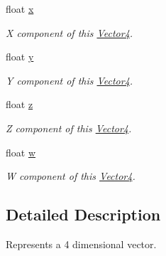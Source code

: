 \begin{DoxyCompactItemize}
\item 
\hypertarget{classchaos_1_1gfx_1_1_vector4_a74f8e26ec8f6c55a11ed5a423fb0eec4}{float \hyperlink{classchaos_1_1gfx_1_1_vector4_a74f8e26ec8f6c55a11ed5a423fb0eec4}{x}}\label{classchaos_1_1gfx_1_1_vector4_a74f8e26ec8f6c55a11ed5a423fb0eec4}

\begin{DoxyCompactList}\small\item\em X component of this \hyperlink{classchaos_1_1gfx_1_1_vector4}{Vector4}. \end{DoxyCompactList}\item 
\hypertarget{classchaos_1_1gfx_1_1_vector4_aa823679c8ce9d8b882f7e05f5670ee74}{float \hyperlink{classchaos_1_1gfx_1_1_vector4_aa823679c8ce9d8b882f7e05f5670ee74}{y}}\label{classchaos_1_1gfx_1_1_vector4_aa823679c8ce9d8b882f7e05f5670ee74}

\begin{DoxyCompactList}\small\item\em Y component of this \hyperlink{classchaos_1_1gfx_1_1_vector4}{Vector4}. \end{DoxyCompactList}\item 
\hypertarget{classchaos_1_1gfx_1_1_vector4_ae1e282cb0c262db6c20f29c34d727938}{float \hyperlink{classchaos_1_1gfx_1_1_vector4_ae1e282cb0c262db6c20f29c34d727938}{z}}\label{classchaos_1_1gfx_1_1_vector4_ae1e282cb0c262db6c20f29c34d727938}

\begin{DoxyCompactList}\small\item\em Z component of this \hyperlink{classchaos_1_1gfx_1_1_vector4}{Vector4}. \end{DoxyCompactList}\item 
\hypertarget{classchaos_1_1gfx_1_1_vector4_a3cd40a2e6ce1fd10a0d2c8136965e9dd}{float \hyperlink{classchaos_1_1gfx_1_1_vector4_a3cd40a2e6ce1fd10a0d2c8136965e9dd}{w}}\label{classchaos_1_1gfx_1_1_vector4_a3cd40a2e6ce1fd10a0d2c8136965e9dd}

\begin{DoxyCompactList}\small\item\em W component of this \hyperlink{classchaos_1_1gfx_1_1_vector4}{Vector4}. \end{DoxyCompactList}\end{DoxyCompactItemize}


\subsection{Detailed Description}
Represents a 4 dimensional vector. 

